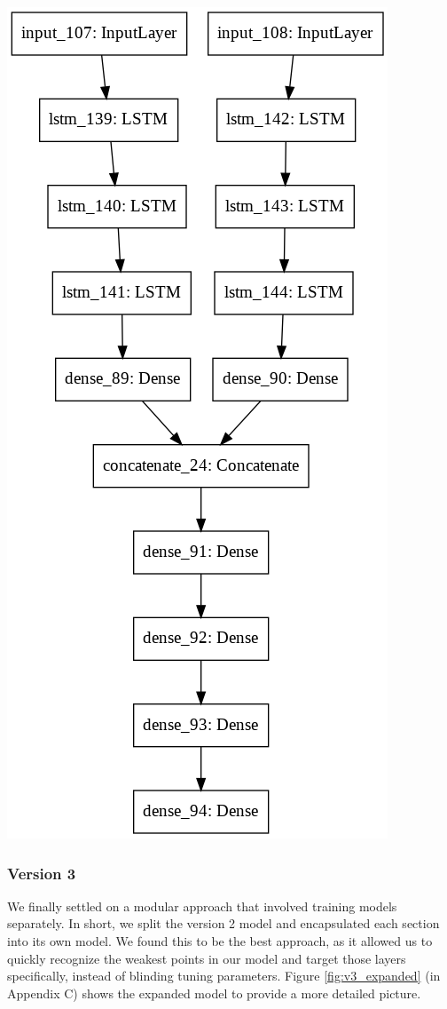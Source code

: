 \documentclass[journal, 12pt]{IEEEtran}
\begin{document}
\begingroup
    \center
    \medskip
    \includegraphics[width=0.9\columnwidth]{./images/v2_model.png}
    \label{fig:v2}
    \medskip
\endgroup

\subsubsection{Version 3}
We finally settled on a modular approach that involved training models separately. In short, we split the version 2 model and encapsulated each section into its own model. We found this to be the best approach, as it allowed us to quickly recognize the weakest points in our model and target those layers specifically, instead of blinding tuning parameters. Figure \ref{fig:v3_expanded} (in Appendix C) shows the expanded model to provide a more detailed picture. 
\end{document}
